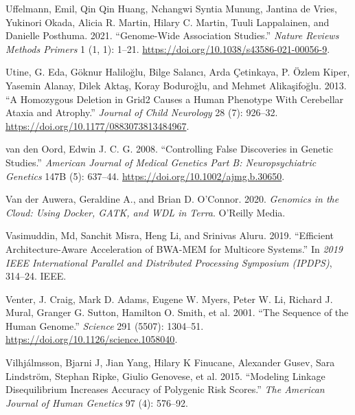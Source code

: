 \documentclass[
]{book}
\newlength{\cslhangindent}
\newlength{\cslentryspacingunit} %
\newenvironment{CSLReferences}[2] %
 {%
  \setlength{\parindent}{0pt}
  \ifodd #1
  \let\oldpar\par
  \def\par{\hangindent=\cslhangindent\oldpar}
  \fi
  \setlength{\parskip}{#2\cslentryspacingunit}
 }%
 {}
\begin{document}
\begin{CSLReferences}{1}{0}
\leavevmode{}%
Uffelmann, Emil, Qin Qin Huang, Nchangwi Syntia Munung, Jantina de Vries, Yukinori Okada, Alicia R. Martin, Hilary C. Martin, Tuuli Lappalainen, and Danielle Posthuma. 2021. {``Genome-Wide Association Studies.''} \emph{Nature Reviews Methods Primers} 1 (1, 1): 1--21. \url{https://doi.org/10.1038/s43586-021-00056-9}.

\leavevmode{}%
Utine, G. Eda, Göknur Haliloğlu, Bilge Salancı, Arda Çetinkaya, P. Özlem Kiper, Yasemin Alanay, Dilek Aktaş, Koray Boduroğlu, and Mehmet Alikaşifoğlu. 2013. {``A {Homozygous Deletion} in {Grid2 Causes} a {Human Phenotype With Cerebellar Ataxia} and {Atrophy}.''} \emph{Journal of Child Neurology} 28 (7): 926--32. \url{https://doi.org/10.1177/0883073813484967}.

\leavevmode{}%
van den Oord, Edwin J. C. G. 2008. {``Controlling False Discoveries in Genetic Studies.''} \emph{American Journal of Medical Genetics Part B: Neuropsychiatric Genetics} 147B (5): 637--44. \url{https://doi.org/10.1002/ajmg.b.30650}.

\leavevmode{}%
Van der Auwera, Geraldine A., and Brian D. O'Connor. 2020. \emph{Genomics in the Cloud: Using {Docker}, {GATK}, and {WDL} in {Terra}}. {O'Reilly Media}.

\leavevmode{}%
Vasimuddin, Md, Sanchit Misra, Heng Li, and Srinivas Aluru. 2019. {``Efficient Architecture-Aware Acceleration of {BWA-MEM} for Multicore Systems.''} In \emph{2019 {IEEE International Parallel} and {Distributed Processing Symposium} ({IPDPS})}, 314--24. {IEEE}.

\leavevmode{}%
Venter, J. Craig, Mark D. Adams, Eugene W. Myers, Peter W. Li, Richard J. Mural, Granger G. Sutton, Hamilton O. Smith, et al. 2001. {``The {Sequence} of the {Human Genome}.''} \emph{Science} 291 (5507): 1304--51. \url{https://doi.org/10.1126/science.1058040}.

\leavevmode{}%
Vilhjálmsson, Bjarni J, Jian Yang, Hilary K Finucane, Alexander Gusev, Sara Lindström, Stephan Ripke, Giulio Genovese, et al. 2015. {``Modeling Linkage Disequilibrium Increases Accuracy of Polygenic Risk Scores.''} \emph{The American Journal of Human Genetics} 97 (4): 576--92.


\end{CSLReferences}
\end{document}
